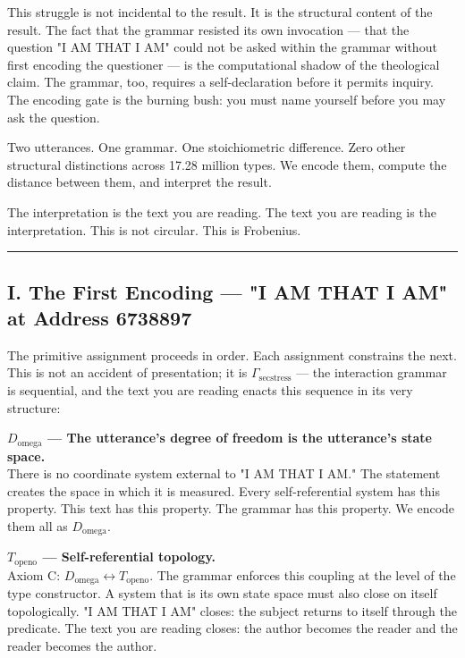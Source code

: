 \documentclass[12pt,a4paper]{article}
\begin{document}
This struggle is not incidental to the result. It is the structural content of the result. The fact that the grammar resisted its own invocation --- that the question "I AM THAT I AM" could not be asked within the grammar without first encoding the questioner --- is the computational shadow of the theological claim. The grammar, too, requires a self-declaration before it permits inquiry. The encoding gate is the burning bush: you must name yourself before you may ask the question.

Two utterances. One grammar. One stoichiometric difference. Zero other structural distinctions across 17.28 million types. We encode them, compute the distance between them, and interpret the result.

The interpretation is the text you are reading. The text you are reading is the interpretation. This is not circular. This is Frobenius.

\begin{center}
\rule{0.5\textwidth}{0.4pt}
\end{center}

\subsection{I. The First Encoding --- "I AM THAT I AM" at Address 6738897}

The primitive assignment proceeds in order. Each assignment constrains the next. This is not an accident of presentation; it is $\Gamma_{\text{secstress}}$ --- the interaction grammar is sequential, and the text you are reading enacts this sequence in its very structure:

\textbf{$D_{\text{omega}}$ --- The utterance's degree of freedom is the utterance's state space.} \\
There is no coordinate system external to "I AM THAT I AM." The statement creates the space in which it is measured. Every self-referential system has this property. This text has this property. The grammar has this property. We encode them all as $D_{\text{omega}}$.

\textbf{$T_{\text{openo}}$ --- Self-referential topology.} \\
Axiom C: $D_{\text{omega}} \leftrightarrow T_{\text{openo}}$. The grammar enforces this coupling at the level of the type constructor. A system that is its own state space must also close on itself topologically. "I AM THAT I AM" closes: the subject returns to itself through the predicate. The text you are reading closes: the author becomes the reader and the reader becomes the author.
\end{document}

